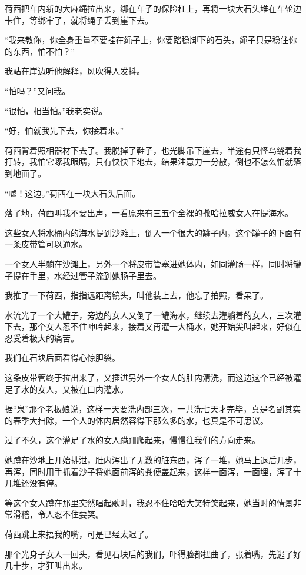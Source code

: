 \par 荷西把车内新的大麻绳拉出来，绑在车子的保险杠上，再将一块大石头堆在车轮边卡住，等绑牢了，就将绳子丢到崖下去。
\par “我来教你，你全身重量不要挂在绳子上，你要踏稳脚下的石头，绳子只是稳住你的东西，怕不怕？”
\par 我站在崖边听他解释，风吹得人发抖。
\par “怕吗？”又问我。
\par “很怕，相当怕。”我老实说。
\par “好，怕就我先下去，你接着来。”
\par 荷西背着照相器材下去了。我脱掉了鞋子，也光脚吊下崖去，半途有只怪鸟绕着我打转，我怕它啄我眼睛，只有快快下地去，结果注意力一分散，倒也不怎么怕就落到地面了。
\par “嘘！这边。”荷西在一块大石头后面。
\par 落了地，荷西叫我不要出声，一看原来有三五个全裸的撒哈拉威女人在提海水。
\par 这些女人将水桶内的海水提到沙滩上，倒入一个很大的罐子内，这个罐子的下面有一条皮带管可以通水。
\par 一个女人半躺在沙滩上，另外一个将皮带管塞进她体内，如同灌肠一样，同时将罐子提在手里，水经过管子流到她肠子里去。
\par 我推了一下荷西，指指远距离镜头，叫他装上去，他忘了拍照，看呆了。
\par 水流光了一个大罐子，旁边的女人又倒了一罐海水，继续去灌躺着的女人，三次灌下去，那个女人忍不住呻吟起来，接着又再灌一大桶水，她开始尖叫起来，好似在忍受着极大的痛苦。
\par 我们在石块后面看得心惊胆裂。
\par 这条皮带管终于拉出来了，又插进另外一个女人的肚内清洗，而这边这个已经被灌足了水的女人，又被在口内灌水。
\par 据“泉”那个老板娘说，这样一天要洗内部三次，一共洗七天才完毕，真是名副其实的春季大扫除，一个人的体内居然容得下那么多的水，也真是不可思议。
\par 过了不久，这个灌足了水的女人蹒跚爬起来，慢慢往我们的方向走来。
\par 她蹲在沙地上开始排泄，肚内泻出了无数的脏东西，泻了一堆，她马上退后几步，再泻，同时用手抓着沙子将她面前泻的粪便盖起来，这样一面泻，一面埋，泻了十几堆还没有停。
\par 等这个女人蹲在那里突然唱起歌时，我忍不住哈哈大笑特笑起来，她当时的情景非常滑稽，令人忍不住要笑。
\par 荷西跳上来捂我的嘴，可是已经太迟了。
\par 那个光身子女人一回头，看见石块后的我们，吓得脸都扭曲了，张着嘴，先逃了好几十步，才狂叫出来。

